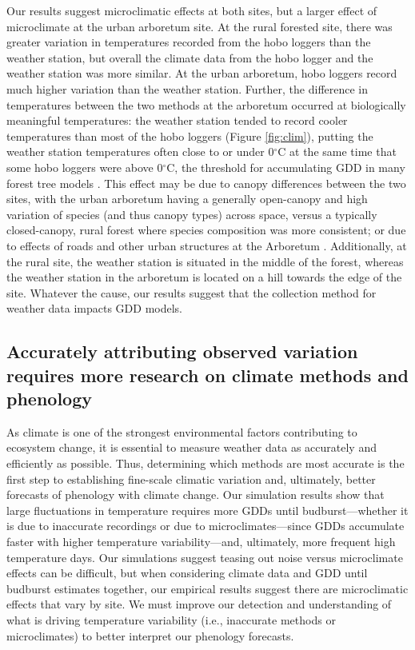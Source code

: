 \documentclass{article}\usepackage[]{graphicx}\usepackage[]{color}
\begin{document}
Our results suggest microclimatic effects at both sites, but a larger effect of microclimate at the urban arboretum site. At the rural forested site, there was greater variation in temperatures recorded from the hobo loggers than the weather station, but overall the climate data from the hobo logger and the weather station was more similar. At the urban arboretum, hobo loggers record much higher variation than the weather station. Further, the difference in temperatures between the two methods at the arboretum occurred at biologically meaningful temperatures: the weather station tended to record cooler temperatures than most of the hobo loggers (Figure \ref{fig:clim}), putting the weather station temperatures often close to or under 0$^{\circ}$C at the same time that some hobo loggers were above 0$^{\circ}$C, the threshold for accumulating GDD in many forest tree models \citep{Man2010}. This effect may be due to canopy differences between the two sites, with the urban arboretum having a generally open-canopy and high variation of species (and thus canopy types) across space, versus a typically closed-canopy, rural forest where species composition was more consistent; or due to effects of roads and other urban structures at the Arboretum \citep{Erell2012,Dimoudi2013,Stabler2005}. Additionally, at the rural site, the weather station is situated in the middle of the forest, whereas the weather station in the arboretum is located on a hill towards the edge of the site. Whatever the cause, our results suggest that the collection method for weather data impacts GDD models.

\subsection*{Accurately attributing observed variation requires more research on climate methods and phenology} 
As climate is one of the strongest environmental factors contributing to ecosystem change, it is essential to measure weather data as accurately and efficiently as possible. Thus, determining which methods are most accurate is the first step to establishing fine-scale climatic variation and, ultimately, better forecasts of phenology with climate change. Our simulation results show that large fluctuations in temperature requires more GDDs until budburst---whether it is due to inaccurate recordings or due to microclimates---since GDDs accumulate faster with higher temperature variability---and, ultimately, more frequent high temperature days. Our simulations suggest teasing out noise versus microclimate effects can be difficult, but when considering climate data and GDD until budburst estimates together, our empirical results suggest there are microclimatic effects that vary by site. We must improve our detection and understanding of what is driving temperature variability (i.e., inaccurate methods or microclimates) to better interpret our phenology forecasts.
  
\end{document}
